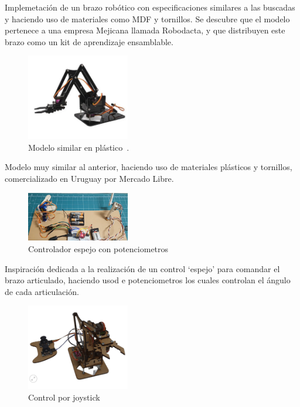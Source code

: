 \begin{multicols}{2}
Implemetación de un brazo robótico con especificaciones similares a las buscadas y haciendo uso de materiales como MDF y tornillos. Se descubre que el modelo pertenece a una empresa Mejicana llamada Robodacta, y que distribuyen este brazo como un kit de aprendizaje ensamblable.

\begin{figure}[H]
  \centering
  \includegraphics[width=0.4\textwidth]{anexos/inspiraciones/7plastico.png}
  \caption{Modelo similar en plástico~\cite{mercadolibre_robot_arm}.}\label{fig:insp.plastico}
\end{figure}

Modelo muy similar al anterior, haciendo uso de materiales plásticos y tornillos, comercializado en Uruguay por Mercado Libre.

\begin{figure}[H]
  \centering
  \includegraphics[width=0.4\textwidth]{anexos/inspiraciones/8control.png}
  \caption{Controlador espejo con potenciometros~\cite{youtube_robot_arm_control}}\label{fig:insp.control}
\end{figure}
Inspiración dedicada a la realización de un control `espejo' para comandar el brazo articulado, haciendo usod e potenciometros los cuales controlan el ángulo de cada articulación.

\begin{figure}[H]
  \centering
  \includegraphics[width=0.4\textwidth]{anexos/inspiraciones/9joystick.png}
  \caption{Control por joystick~\cite{robodacta_mini_arm_joystick}}\label{fig:insp.joystick}
\end{figure}


\end{multicols}
